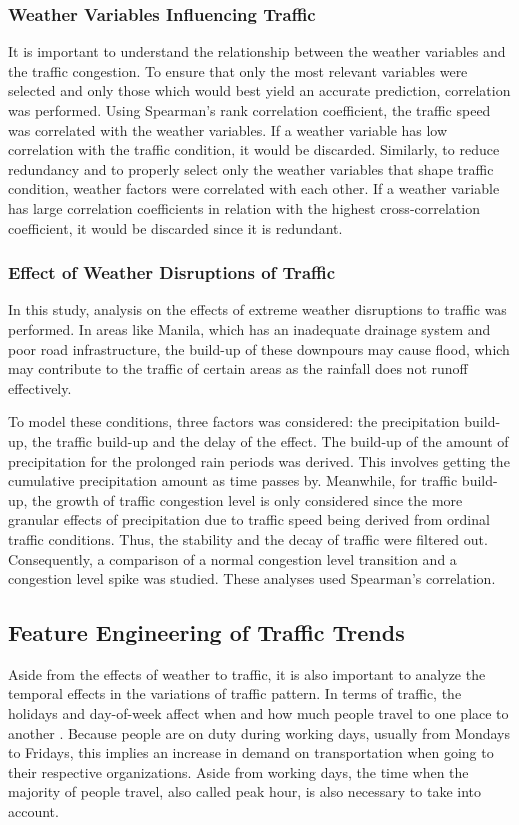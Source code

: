 \subsubsection{Weather Variables Influencing Traffic}
It is important to understand the relationship between the weather variables and the traffic congestion. To ensure that only the most relevant variables were selected and only those which would best yield an accurate prediction, correlation was performed. Using Spearman's rank correlation coefficient, the traffic speed was correlated with the weather variables. If a weather variable has low correlation with the traffic condition, it would be discarded. Similarly, to reduce redundancy and to properly select only the weather variables that shape traffic condition, weather factors were correlated with each other. If a weather variable has large correlation coefficients in relation with the highest cross-correlation coefficient, it would be discarded since it is redundant.

\subsubsection{Effect of Weather Disruptions of Traffic}
In this study, analysis on the effects of extreme weather disruptions to traffic was performed. In areas like Manila, which has an inadequate drainage system and poor road infrastructure, the build-up of these downpours may cause flood, which may contribute to the traffic of certain areas as the rainfall does not runoff effectively. 

To model these conditions, three factors was considered: the precipitation build-up, the traffic build-up and the delay of the effect. The build-up of the amount of precipitation for the prolonged rain periods was derived. This involves getting the cumulative precipitation amount as time passes by. Meanwhile, for traffic build-up, the growth of traffic congestion level is only considered since the more granular effects of precipitation due to traffic speed being derived from ordinal traffic conditions. Thus, the stability and the decay of traffic were filtered out. Consequently, a comparison of a normal congestion level transition and a congestion level spike was studied. These analyses used Spearman’s correlation. 

\subsection{Feature Engineering of Traffic Trends}
Aside from the effects of weather to traffic, it is also important to analyze the temporal effects in the variations of traffic pattern. In terms of traffic, the holidays and day-of-week affect when and how much people travel to one place to another . Because people are on duty during working days, usually from Mondays to Fridays, this implies an increase in demand on transportation when going to their respective organizations. Aside from working days, the time when the majority of people travel, also called peak hour, is also necessary to take into account. 


